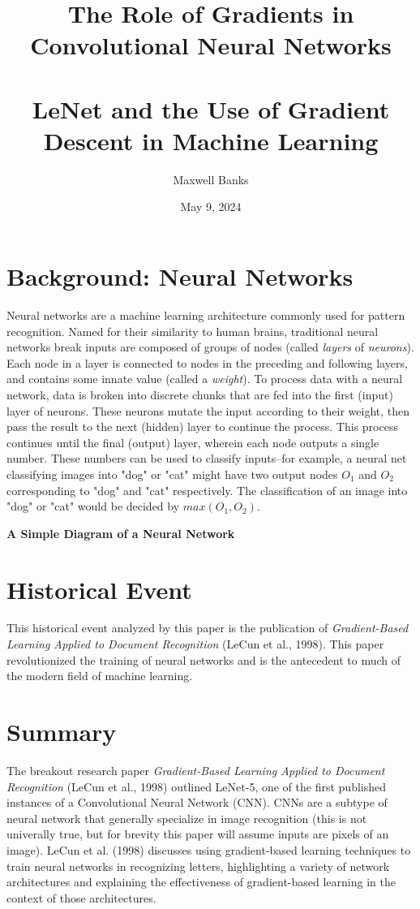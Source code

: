 \documentclass[11pt, a4paper]{article}
\title{
    The Role of Gradients in Convolutional Neural Networks\\~\\
    \large LeNet and the Use of Gradient Descent in Machine Learning}
\author{
    Maxwell Banks
}
\date{May 9, 2024}
\begin{document}
\maketitle
\newpage
\section{Background: Neural Networks}
Neural networks are a machine learning architecture commonly used for pattern recognition. Named for their 
similarity to human brains, traditional neural networks break inputs are composed of groups of nodes (called 
\textit{layers} of \textit{neurons}). Each node in a layer is connected to nodes in the preceding and following
layers, and contains some innate value (called a \textit{weight}). To process data with a neural network, data
is broken into discrete chunks that are fed into the first (input) layer of neurons. These neurons mutate the 
input according to their weight, then pass the result to the next (hidden) layer to continue the process. This 
process continues until the final (output) layer, wherein each node outputs a single number. These numbers can 
be used to classify inputs--for example, a neural net classifying images into "dog" or "cat" might have two
output nodes $O_1$ and $O_2$ corresponding to "dog" and "cat" respectively. The classification of an image into
"dog" or "cat" would be decided by $max(O_1, O_2)$. \\
\begin{center}
    \textbf{A Simple Diagram of a Neural Network}\\
    
\end{center}

\section{Historical Event}
This historical event analyzed by this paper is the publication of \textit{Gradient-Based Learning Applied to Document Recognition} (LeCun et al., 1998).
This paper revolutionized the training of neural networks and is the antecedent to much of the modern field of 
machine learning. 

\section{Summary}
The breakout research paper \textit{Gradient-Based Learning Applied to Document Recognition} (LeCun et al., 1998)
outlined LeNet-5, one of the first published instances of a Convolutional Neural Network (CNN). CNNs are a subtype
of neural network that generally specialize in image recognition (this is not univerally true, but for brevity this
paper will assume inputs are pixels of an image). LeCun et al. (1998) discusses using gradient-based learning 
techniques to train neural networks in recognizing letters, highlighting a variety of network architectures 
and explaining the effectiveness of gradient-based learning in the context of those architectures. \\
\end{document}
